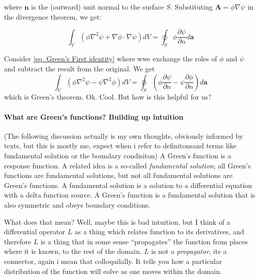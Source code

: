 \documentclass[../../main.tex]{subfiles} %
\begin{document}
where $\mathbf{n}$ is the (outward) unit normal to the surface $S$. Substituting $\mathbf{A} = \phi\nabla\psi$ in the divergence theorem, we get:

\begin{equation} \label{eq. Green's First identity}
\int_V (\phi\nabla^2\psi + \nabla\phi\cdot\nabla\psi) dV = \oint_S \phi\frac{\partial\psi}{\partial n} d\mathbf{a}
\end{equation}

Consider \ref{eq. Green's First identity} where wwe exchange the roles of $\phi$ and $\psi$ and subtract the result from the original. We get
\begin{equation} \label{eq. Green's Theorem}
    \int_V (\phi\nabla^2\psi - \psi\nabla^2\phi) dV = \oint_S \left(\phi\frac{\partial\psi}{\partial n} - \psi\frac{\partial\phi}{\partial n}\right) d\mathbf{a}
\end{equation}
which is Green's theorem. Ok. Cool. But how is this helpful for us?
\paragraph{What are Green's functions? Building up intuition} (The following discussion actually is my own thoughts, obviously informed by texts, but this is mostly me, expect when i refer to definitonsand terms like fundamental solution or the boundary condisiton) A Green's function is a response function. A related idea is a so-called \textit{fundamental solution}; all Green's functions are fundamental solutions, but not all fundamental solutions are Green's functions. A fundamental solution is a solution to a differential equation with a delta function source. A Green's function is a fundamental solution that is also symmetric and obeys boundary conditions.  

What does that mean? Well, maybe this is bad intuition, but I think of a differential operator $L$ as a thing which relates function to its derivatives, and therefore $L$ is a thing that in some sense ``propagates'' the function from places where it is known, to the rest of the domain. $L$ is not a \textit{propagator}, its a connector, again i mean that colloquilally. It tells you how a particular distribution of the function will eolve as one moves within the domain. 
\end{document}
